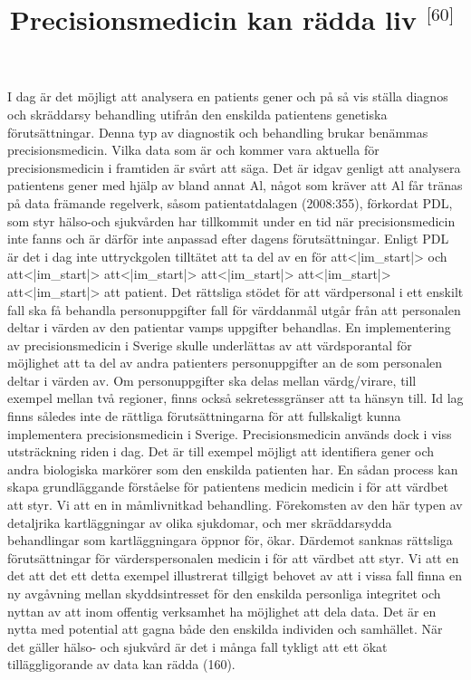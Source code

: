 {{

\title{
Precisionsmedicin kan rädda liv \({ }^{\text {[60] }}\)
}
I dag är det möjligt att analysera en patients gener och på så vis ställa diagnos och skräddarsy behandling utifrån den enskilda patientens genetiska förutsättningar. Denna typ av diagnostik och behandling brukar benämmas precisionsmedicin. Vilka data som är och kommer vara aktuella för precisionsmedicin i framtiden är svårt att säga. Det är idgav genligt att analysera patientens gener med hjälp av bland annat \(\mathrm{Al}\), något som kräver att \(\mathrm{Al}\) får tränas på data främande regelverk, såsom patientatdalagen (2008:355), förkordat PDL, som styr hälso-och sjukvården har tillkommit under en tid när precisionsmedicin inte fanns och är därför inte anpassad efter dagens förutsättningar. Enligt PDL är det i dag inte uttryckgolen tilltätet att ta del av en för att<|im_start|> och att<|im_start|> att<|im_start|> att<|im_start|> att<|im_start|> att<|im_start|> att patient. Det rättsliga stödet för att värdpersonal i ett enskilt fall ska få behandla personuppgifter fall för värddanmål utgår från att personalen deltar i värden av den patientar vamps uppgifter behandlas. En implementering av precisionsmedicin i Sverige skulle underlättas av att värdsporantal för möjlighet att ta del av andra patienters personuppgifter an de som personalen deltar i värden av.
Om personuppgifter ska delas mellan värdg/virare, till exempel mellan två regioner, finns också sekretessgränser att ta hänsyn till. Id lag finns således inte de rättliga förutsättningarna för att fullskaligt kunna implementera precisionsmedicin i Sverige. Precisionsmedicin används dock i viss utsträckning riden i dag. Det är till exempel möjligt att identifiera gener och andra biologiska markörer som den enskilda patienten har. En sådan process kan skapa grundläggande förståelse för patientens medicin medicin i för att värdbet att styr. Vi att en in måmlivnitkad behandling. Förekomsten av den här typen av detaljrika kartläggningar av olika sjukdomar, och mer skräddarsydda behandlingar som kartläggningara öppnor för, ökar. Därdemot sanknas rättsliga förutsättningar för värderspersonalen medicin i för att värdbet att styr. Vi att en det att det ett detta exempel illustrerat tillgigt behovet av att i vissa fall finna en ny avgåvning mellan skyddsintresset för den enskilda personliga integritet och nyttan av att inom offentig verksamhet ha möjlighet att dela data. Det är en nytta med potential att gagna både den enskilda individen och samhället. När det gäller hälso- och sjukvård är det i många fall tykligt att ett ökat tilläggligorande av data kan rädda (160).

}}

